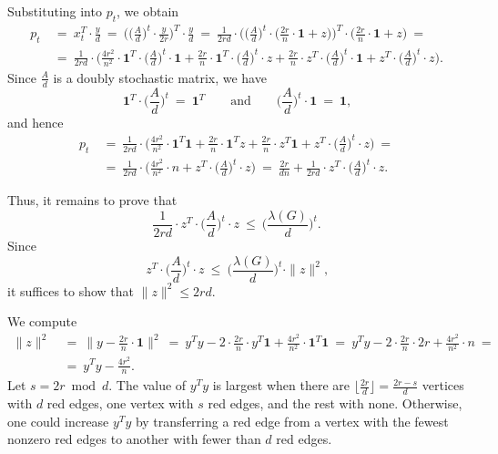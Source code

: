 \documentclass[12pt]{article}
\begin{document}
	Substituting into \(p_{t}\), we obtain
	\begin{align*}
		p_{t} \ &= \ x_{t}^{T} \cdot \frac{y}{d} \ = \ \Bigg( \bigg( \frac{A}{d}
		\bigg)^{t} \cdot \frac{y}{2 r} \Bigg)^{T} \cdot \frac{y}{d} \ = \
		\frac{1}{2 r d} \cdot \Bigg( \bigg( \frac{A}{d} \bigg)^{t} \cdot \bigg(
		\frac{2 r}{n} \cdot \mathbf{1} + z \bigg) \Bigg)^{T} \cdot \bigg(
		\frac{2 r}{n} \cdot \mathbf{1} + z \bigg) \ = \\
		&= \ \frac{1}{2 r d} \cdot \Bigg( \frac{4 r^{2}}{n^{2}} \cdot
		\mathbf{1}^{T} \cdot \bigg( \frac{A}{d} \bigg)^{t} \cdot \mathbf{1} +
		\frac{2 r}{n} \cdot \mathbf{1}^{T} \cdot \bigg( \frac{A}{d} \bigg)^{t}
		\cdot z + \frac{2r}{n} \cdot z^{T} \cdot \bigg( \frac{A}{d} \bigg)^{t}
		\cdot \mathbf{1} + z^{T} \cdot \bigg( \frac{A}{d} \bigg)^{t} \cdot z
		\Bigg) \text{.}
	\end{align*}
	Since \(\frac{A}{d}\) is a doubly stochastic matrix, we have
	\[
		\mathbf{1}^{T} \cdot \bigg( \frac{A}{d} \bigg)^{t} \ = \ \mathbf{1}^{T}
		\qquad \text{and} \qquad \bigg( \frac{A}{d} \bigg)^{t} \cdot \mathbf{1}
		\ = \ \mathbf{1} \text{,}
	\]
	and hence
	\begin{align*}
		p_{t} \ &= \ \frac{1}{2 r d} \cdot \Bigg( \frac{4 r^{2}}{n^{2}} \cdot
		\mathbf{1}^{T} \mathbf{1} + \frac{2 r}{n} \cdot \mathbf{1}^{T} z +
		\frac{2 r}{n} \cdot z^{T} \mathbf{1} + z^{T} \cdot \bigg( \frac{A}{d}
		\bigg)^{t} \cdot z \Bigg) \ = \\
		& = \ \frac{1}{2 r d} \cdot \Bigg( \frac{4 r^{2}}{n^{2}} \cdot n + z^{T}
		\cdot \bigg( \frac{A}{d} \bigg)^{t} \cdot z \Bigg) \ = \ \frac{2 r}{d n}
		 + \frac{1}{2 r d} \cdot z^{T} \cdot \bigg( \frac{A}{d} \bigg)^{t} \cdot
		 z \text{.}
	\end{align*}
	
	\medskip
	
	Thus, it remains to prove that
	\[
		\frac{1}{2 r d} \cdot z^{T} \cdot \bigg( \frac{A}{d} \bigg)^{t} \cdot z
		\ \leqslant \ \bigg( \frac{\lambda(G)}{d} \bigg)^{t} \text{.}
	\]
	Since
	\[
		z^{T} \cdot \bigg( \frac{A}{d} \bigg)^{t} \cdot z \ \leqslant \  \bigg(
		\frac{\lambda(G)}{d} \bigg)^{t} \cdot \|z\|^{2} \text{,}
	\]
	it suffices to show that \(\|z\|^{2} \leqslant 2 r d\).
	
	\medskip
	
	We compute
	\begin{align*}
		\|z\|^{2} \ &= \ \bigg\| y - \frac{2 r}{n} \cdot \mathbf{1} \bigg\|^{2}
		\ = \ y^{T} y - 2 \cdot \frac{2 r}{n} \cdot y^{T} \mathbf{1} +
		\frac{4 r^{2}}{n^{2}} \cdot \mathbf{1}^{T} \mathbf{1} \ = \ y^{T} y - 2
		\cdot \frac{2 r}{n} \cdot 2 r + \frac{4 r^{2}}{n^{2}} \cdot n \ = \\
		&= \ y^{T} y - \frac{4 r^{2}}{n} \text{.}
	\end{align*}
	Let \(s = 2 r \bmod d\). The value of \(y^{T} y\) is largest when there are
	\(\big\lfloor \frac{2 r}{d} \big\rfloor = \frac{2 r - s}{d}\) vertices with
	\(d\) red edges, one vertex with \(s\) red edges, and the rest with none.
	Otherwise, one could increase \(y^{T} y\) by transferring a red edge from a
	vertex with the fewest nonzero red edges to another with fewer than \(d\)
	red edges.
	
\end{document}
